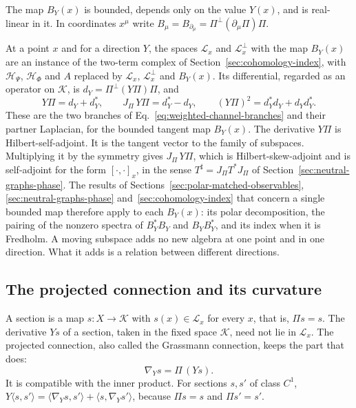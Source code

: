 \documentclass[11pt]{article}
\theoremstyle{definition}
\begin{document}
The map $B_Y(x)$ is bounded, depends only on the value $Y(x)$, and is real-linear in it. In coordinates $x^\mu$ write $B_\mu=B_{\partial_\mu}=\Pi^\perp(\partial_\mu\Pi)\Pi$.

At a point $x$ and for a direction $Y$, the spaces $\mathcal L_x$ and $\mathcal L_x^\perp$ with the map $B_Y(x)$ are an instance of the two-term complex of Section~\ref{sec:cohomology-index}, with $\mathcal H_\Psi$, $\mathcal H_\Phi$ and $A$ replaced by $\mathcal L_x$, $\mathcal L_x^\perp$ and $B_Y(x)$. Its differential, regarded as an operator on $\mathcal K$, is $d_Y=\Pi^\perp(Y\Pi)\Pi$, and
\begin{equation}
 Y\Pi=d_Y+d_Y^*,\qquad J_\Pi\,Y\Pi=d_Y^*-d_Y,\qquad (Y\Pi)^2=d_Y^*d_Y+d_Yd_Y^* .
 \label{eq:moving-two-odd}
\end{equation}
These are the two branches of Eq.~\eqref{eq:weighted-channel-branches} and their partner Laplacian, for the bounded tangent map $B_Y(x)$. The derivative $Y\Pi$ is Hilbert-self-adjoint. It is the tangent vector to the family of subspaces. Multiplying it by the symmetry gives $J_\Pi\,Y\Pi$, which is Hilbert-skew-adjoint and is self-adjoint for the form $[\cdot,\cdot]_x$, in the sense $T^\sharp=J_\Pi T^*J_\Pi$ of Section~\ref{sec:neutral-graphs-phase}. The results of Sections~\ref{sec:polar-matched-observables}, \ref{sec:neutral-graphs-phase} and~\ref{sec:cohomology-index} that concern a single bounded map therefore apply to each $B_Y(x)$: its polar decomposition, the pairing of the nonzero spectra of $B_Y^*B_Y$ and $B_YB_Y^*$, and its index when it is Fredholm. A moving subspace adds no new algebra at one point and in one direction. What it adds is a relation between different directions.

\subsection{The projected connection and its curvature}
\label{subsec:moving-connection}

A section is a map $s:X\to\mathcal K$ with $s(x)\in\mathcal L_x$ for every $x$, that is, $\Pi s=s$. The derivative $Ys$ of a section, taken in the fixed space $\mathcal K$, need not lie in $\mathcal L_x$. The projected connection, also called the Grassmann connection, keeps the part that does:
\begin{equation}
 \nabla_Ys=\Pi\,(Ys).
 \label{eq:moving-connection}
\end{equation}
It is compatible with the inner product. For sections $s,s'$ of class $C^1$, $Y\langle s,s'\rangle=\langle\nabla_Ys,s'\rangle+\langle s,\nabla_Ys'\rangle$, because $\Pi s=s$ and $\Pi s'=s'$.
\end{document}
